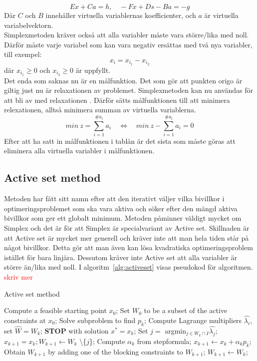 $$Ex+Ca = h, \quad -Fx + Ds - Ba = -g$$
Där $C$ och $B$ innehåller virtuella variablernas koefficienter, och $a$ är virtuella variabelvektorn. \\ 
Simplexmetoden kräver också att alla variabler måste vara större/lika med noll. Därför måste varje variabel som kan vara negativ ersättas med två nya variabler, till exempel:
$$x_i = x_{i_1} - x_{i_2}$$
där $x_{i_1}\geq 0$ och $x_{i_2}\geq 0$ är uppfyllt. \\
Det enda som saknas nu är en målfunktion. Det som gör att punkten origo är giltig just nu är relaxationen av problemet. Simplexmetoden kan nu användas för att bli av med relaxationen . Därför sätts målfunktionen till att minimera relexationen, alltså minimera summan av virtuella variablerna.
$$min \: z = \sum^{\#a_i}_{i=1} {a_i} \quad  \Leftrightarrow \quad min \: z - \sum^{\#a_i}_{i=1} {a_i} = 0$$
Efter att ha satt in målfunktionen i tablån är det sista som måste göras att eliminera alla virtuella variabler i målfunktionen. \citep{numericaloptimization}

\subsection{Active set method}   
Metoden har fått sitt namn efter att den iterativt väljer vilka bivillkor i optimeringsproblemet som ska vara aktiva och söker efter den mängd aktiva bivillkor som ger ett globalt minimum. Metoden påminner väldigt mycket om Simplex och det är för att Simplex är specialvariant av Active set. Skillnaden är att Active set är mycket mer generell och kräver inte att man hela tiden står på något bivillkor. Detta gör att man även kan lösa kvadratiska optimeringsproblem istället för bara linjära. Dessutom kräver inte Active set att alla variabler är större än/lika med noll. I algoritm~\ref{alg:activeset} visas pseudokod för algoritmen. 
\citep{numericaloptimization}
\textcolor{red}{skriv mer}

\begin{algorithm}[H]
\caption{Active set method}
\label{alg:activeset}
\begin{algorithmic}
\State Compute a feasible starting point $x_0$;
\State Set $W_0$ to be a subset of the active constraints at $x_0$;
	\State Solve subproblem to find $p_k$;
		\State Compute Lagrange multipliers $\hat{\lambda_i}$,
		\State set $\hat{W} = W_k$; 
			\State \textbf{STOP} with solution $x^* = x_k$;
		\Else
			\State Set $j =$ argmin$_{j \in W_k \cap I}\hat{\lambda_j}$;
			\State $x_{k+1} = x_k; W_{k+1} \gets W_k$ \textbackslash \{$j$\};		
		\EndIf
	\Else		
		\State Compute $\alpha_k$ from stepformula;
		\State $x_{k+1} \gets x_k + \alpha_k p_k$;
			\State Obtain $W_{k+1}$ by adding one of the blocking constraints to $W_{k+1}$;
		\Else
			\State $W_{k+1} \gets W_k$;	
		\EndIf 	
	\EndIf
\EndFor 
\EndProcedure
\end{algorithmic}
\end{algorithm}


